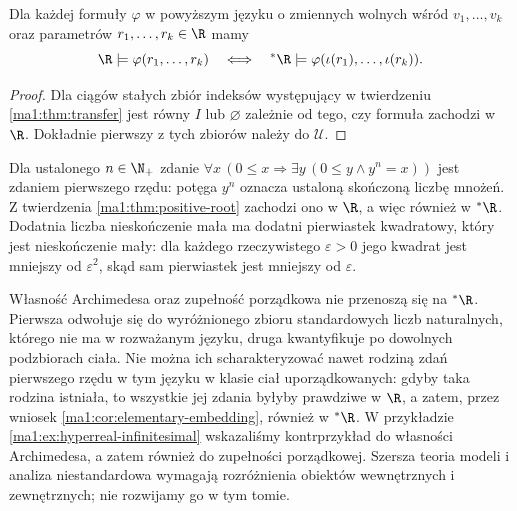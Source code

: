 \begin{wniosek}
\label{ma1:cor:elementary-embedding}
Dla każdej formuły $\varphi$ w powyższym języku o zmiennych wolnych wśród $v_1,\ldots,v_k$ oraz parametrów $r_1,\ldots,r_k\in\R$ mamy
\[
 \R\models\varphi(r_1,\ldots,r_k)
 \quad\Longleftrightarrow\quad
 {}^*\R\models\varphi(\iota(r_1),\ldots,\iota(r_k)).
\]
\end{wniosek}
\begin{proof}
Dla ciągów stałych zbiór indeksów występujący w twierdzeniu \ref{ma1:thm:transfer} jest równy $I$ lub $\varnothing$ zależnie od tego, czy formuła zachodzi w $\R$. Dokładnie pierwszy z tych zbiorów należy do $\mathcal U$.
\end{proof}
\begin{przyklad}
Dla ustalonego $n\in\N_+$ zdanie $\forall x\,(0\le x\Rightarrow\exists y\,(0\le y\land y^n=x))$ jest zdaniem pierwszego rzędu: potęga $y^n$ oznacza ustaloną skończoną liczbę mnożeń. Z twierdzenia \ref{ma1:thm:positive-root} zachodzi ono w $\R$, a więc również w $\mathord{}^*\R$. Dodatnia liczba nieskończenie mała ma dodatni pierwiastek kwadratowy, który jest nieskończenie mały: dla każdego rzeczywistego $\varepsilon>0$ jego kwadrat jest mniejszy od $\varepsilon^2$, skąd sam pierwiastek jest mniejszy od $\varepsilon$.
\end{przyklad}
\begin{uwaga}
Własność Archimedesa oraz zupełność porządkowa nie przenoszą się na $\mathord{}^*\R$. Pierwsza odwołuje się do wyróżnionego zbioru standardowych liczb naturalnych, którego nie ma w rozważanym języku, druga kwantyfikuje po dowolnych podzbiorach ciała. Nie można ich scharakteryzować nawet rodziną zdań pierwszego rzędu w tym języku w klasie ciał uporządkowanych: gdyby taka rodzina istniała, to wszystkie jej zdania byłyby prawdziwe w $\R$, a zatem, przez wniosek \ref{ma1:cor:elementary-embedding}, również w $\mathord{}^*\R$. W przykładzie \ref{ma1:ex:hyperreal-infinitesimal} wskazaliśmy kontrprzykład do własności Archimedesa, a zatem również do zupełności porządkowej. Szersza teoria modeli i analiza niestandardowa wymagają rozróżnienia obiektów wewnętrznych i zewnętrznych; nie rozwijamy go w tym tomie.
\end{uwaga}

